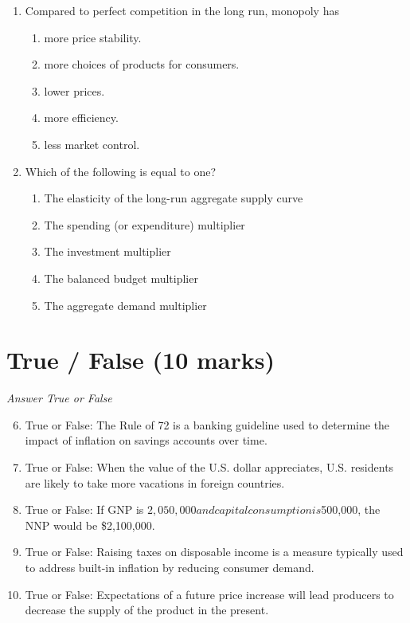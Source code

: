 \documentclass[12pt]{article}
\begin{document}
\begin{enumerate}[label=\arabic*.]
\begin{enumerate}[label=(\alph*)]
\end{enumerate}
\item Compared to perfect competition in the long run, monopoly has
\begin{enumerate}[label=(\alph*)]
    \item more price stability.
    \item more choices of products for consumers.
    \item lower prices.
    \item more efficiency.
    \item less market control.
\end{enumerate}
\item Which of the following is equal to one?
\begin{enumerate}[label=(\alph*)]
    \item The elasticity of the long-run aggregate supply curve
    \item The spending (or expenditure) multiplier
    \item The investment multiplier
    \item The balanced budget multiplier
    \item The aggregate demand multiplier
\end{enumerate}
\end{enumerate}

\section*{True / False (10 marks)}
\textit{Answer True or False}
\begin{enumerate}[label=\arabic*.]
\setcounter{enumi}{5}
\item True or False: The Rule of 72 is a banking guideline used to determine the impact of inflation on savings accounts over time.
\item True or False: When the value of the U.S. dollar appreciates, U.S. residents are likely to take more vacations in foreign countries.
\item True or False: If GNP is $2,050,000 and capital consumption is $500,000, the NNP would be \$2,100,000.
\item True or False: Raising taxes on disposable income is a measure typically used to address built-in inflation by reducing consumer demand.
\item True or False: Expectations of a future price increase will lead producers to decrease the supply of the product in the present.
\end{enumerate}
\end{document}
